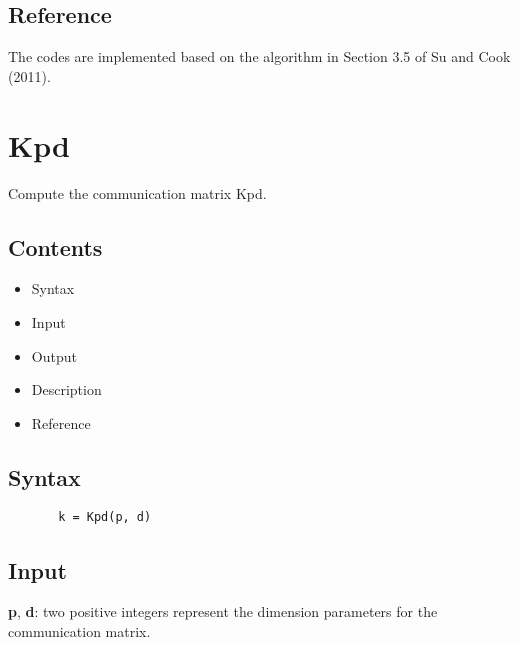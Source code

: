 \documentclass[a4paper,11pt,openany]{memoir}
\begin{document}
\subsection*{Reference}

\begin{par}
The codes are implemented based on the algorithm in Section 3.5 of Su and Cook (2011).
\end{par} \vspace{1em}


\newpage

\rmfamily
\color{black}\section{Kpd}

\begin{par}
Compute the communication matrix Kpd.
\end{par} \vspace{1em}

\subsection*{Contents}

\begin{itemize}
\setlength{\itemsep}{-1ex}
   \item Syntax
   \item Input
   \item Output
   \item Description
   \item Reference
\end{itemize}


\subsection*{Syntax}


\begin{verbatim}       k = Kpd(p, d)\end{verbatim}
    

\subsection*{Input}

\begin{par}
\textbf{p}, \textbf{d}: two positive integers represent the dimension parameters for the communication matrix.
\end{par} \vspace{1em}
\end{document}
